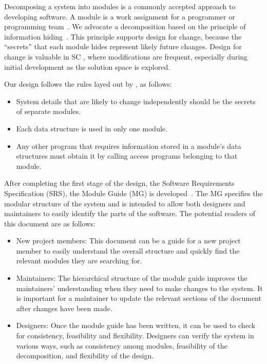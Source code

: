 \documentclass[12pt, titlepage]{article}
\begin{document}
Decomposing a system into modules is a commonly accepted approach to developing
software.  A module is a work assignment for a programmer or programming
team~\citep{ParnasEtAl1984}.  We advocate a decomposition
based on the principle of information hiding~\citep{Parnas1972a}.  This
principle supports design for change, because the ``secrets'' that each module
hides represent likely future changes.  Design for change is valuable in SC ,
where modifications are frequent, especially during initial development as the
solution space is explored.  

Our design follows the rules layed out by \citet{ParnasEtAl1984}, as follows:
\begin{itemize}
\item System details that are likely to change independently should be the
  secrets of separate modules.
\item Each data structure is used in only one module.
\item Any other program that requires information stored in a module's data
  structures must obtain it by calling access programs belonging to that module.
\end{itemize}

After completing the first stage of the design, the Software Requirements
Specification (SRS), the Module Guide (MG) is developed~\citep{ParnasEtAl1984}. The MG
specifies the modular structure of the system and is intended to allow both
designers and maintainers to easily identify the parts of the software.  The
potential readers of this document are as follows:

\begin{itemize}
\item New project members: This document can be a guide for a new project member
  to easily understand the overall structure and quickly find the
  relevant modules they are searching for.
\item Maintainers: The hierarchical structure of the module guide improves the
  maintainers' understanding when they need to make changes to the system. It is
  important for a maintainer to update the relevant sections of the document
  after changes have been made.
\item Designers: Once the module guide has been written, it can be used to
  check for consistency, feasibility and flexibility. Designers can verify the
  system in various ways, such as consistency among modules, feasibility of the
  decomposition, and flexibility of the design.
\end{itemize}
\end{document}
